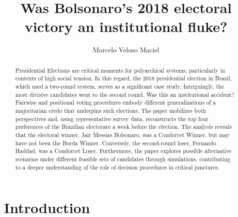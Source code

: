 \documentclass[hidelinks,11pt]{article} \usepackage[utf8]{inputenc}
\author{Marcelo Veloso Maciel
} \date{}
\title{Was Bolsonaro's 2018 electoral victory an institutional fluke?}
\begin{document}
\maketitle
\begin{abstract}

  Presidential Elections are critical moments for polyarchical systems,
  particularly in contexts of high social tension. In this regard, the 2018
  presidential election in Brazil, which used a two-round system, serves as a
  significant case study. Intriguingly, the most divisive candidates went to the
  second round. Was this an institutional accident? Pairwise and positional
  voting procedures embody different generalizations of a majoritarian credo
  that underpins such elections. The paper mobilizes both perspectives and,
  using representative survey data, reconstructs the top four preferences of the
  Brazilian electorate a week before the election. The analysis reveals that the
  electoral winner, Jair Messias Bolsonaro, was a Condorcet Winner, but may have
  not been the Borda Winner. Conversely, the second-round loser, Fernando
  Haddad, was a Condorcet Loser. Furthermore, the paper explores possible
  alternative scenarios under different feasible sets of candidates through
  simulations, contributing to a deeper understanding of the role of decision
  procedures in critical junctures.


  \end{abstract}
\section{Introduction}
\end{document}
